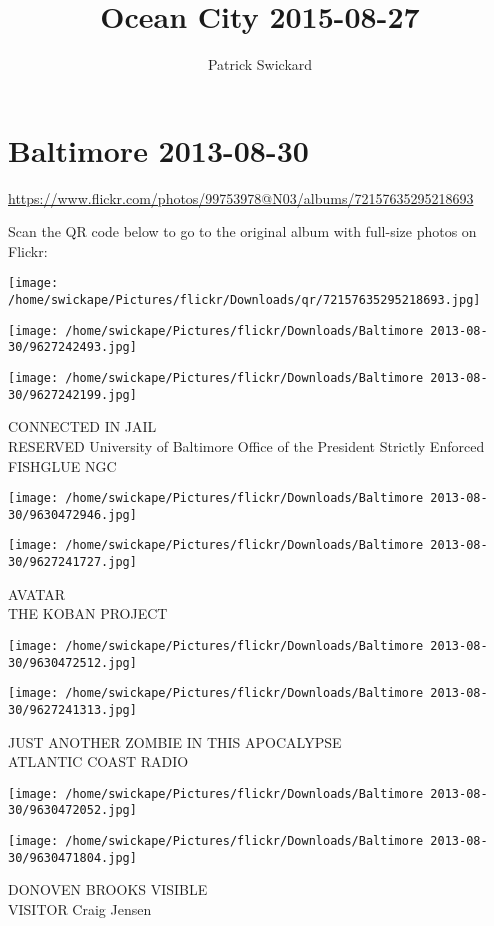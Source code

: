 \documentclass[10pt,letterpaper]{article}
\title{Ocean City 2015-08-27}
\author{Patrick Swickard}
\date{}
\begin{document}
\section*{Baltimore 2013-08-30}

\url{https://www.flickr.com/photos/99753978@N03/albums/72157635295218693}

Scan the QR code below to go to the original album with full-size photos on Flickr:

\texttt{[image: /home/swickape/Pictures/flickr/Downloads/qr/72157635295218693.jpg]}
\pagebreak

\texttt{[image: /home/swickape/Pictures/flickr/Downloads/Baltimore 2013-08-30/9627242493.jpg]}

\vspace{0.25in}
\texttt{[image: /home/swickape/Pictures/flickr/Downloads/Baltimore 2013-08-30/9627242199.jpg]}

CONNECTED IN JAIL\\
RESERVED University of Baltimore Office of the President Strictly Enforced FISHGLUE NGC
\pagebreak

\texttt{[image: /home/swickape/Pictures/flickr/Downloads/Baltimore 2013-08-30/9630472946.jpg]}

\vspace{0.25in}
\texttt{[image: /home/swickape/Pictures/flickr/Downloads/Baltimore 2013-08-30/9627241727.jpg]}

AVATAR\\
THE KOBAN PROJECT
\pagebreak

\texttt{[image: /home/swickape/Pictures/flickr/Downloads/Baltimore 2013-08-30/9630472512.jpg]}

\vspace{0.25in}
\texttt{[image: /home/swickape/Pictures/flickr/Downloads/Baltimore 2013-08-30/9627241313.jpg]}

JUST ANOTHER ZOMBIE IN THIS APOCALYPSE\\
ATLANTIC COAST RADIO
\pagebreak

\texttt{[image: /home/swickape/Pictures/flickr/Downloads/Baltimore 2013-08-30/9630472052.jpg]}

\vspace{0.25in}
\texttt{[image: /home/swickape/Pictures/flickr/Downloads/Baltimore 2013-08-30/9630471804.jpg]}

DONOVEN BROOKS VISIBLE\\
VISITOR Craig Jensen
\pagebreak
\end{document}
